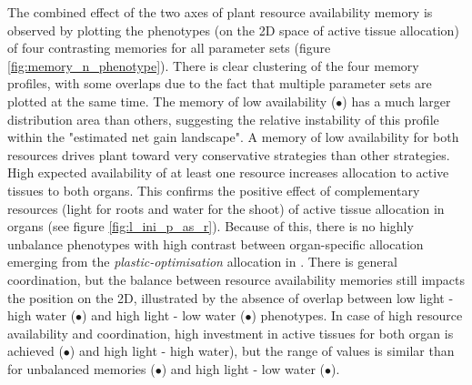 The combined effect of the two axes of plant resource availability memory is observed by plotting the phenotypes (on the 2D space of active tissue allocation) of four contrasting memories for all parameter sets (figure \ref{fig:memory_n_phenotype}). There is clear clustering of the four memory profiles, with some overlaps due to the fact that multiple parameter sets are plotted at the same time. The memory of low availability (\textcolor{myRed}{$\bullet$}) has a much larger distribution area than others, suggesting the relative instability of this profile within the "estimated net gain landscape". A memory of low availability for both resources drives plant toward very conservative strategies than other strategies. High expected availability of at least one resource increases allocation to active tissues to both organs. This confirms the positive effect of complementary resources (light for roots and water for the shoot) of active tissue allocation in organs (see figure \ref{fig:l_ini_p_as_r}). Because of this, there is no highly unbalance phenotypes with high contrast between organ-specific allocation emerging from the \textit{plastic-optimisation} allocation in \model. There is general coordination, but the balance between resource availability memories still impacts the position on the 2D, illustrated by the absence of overlap between low light - high water  (\textcolor{myBlue}{$\bullet$}) and high light - low water (\textcolor{myYellow}{$\bullet$}) phenotypes. In case of high resource availability and coordination, high investment in active tissues for both organ is achieved (\textcolor{myGreen}{$\bullet$}) and high light - high water), but the range of values is similar than for unbalanced memories (\textcolor{myBlue}{$\bullet$}) and high light - low water (\textcolor{myYellow}{$\bullet$}).

